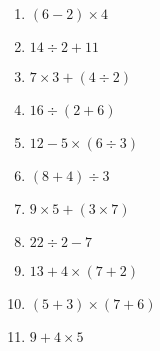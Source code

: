 \documentclass{article}
\begin{document}
\begin{enumerate}
\item \quad \( (6 - 2) \times 4 \)
\vspace{45pt}
\hline
\vspace{5pt}

\item \quad \( 14 \div 2 + 11 \)
\vspace{45pt}
\hline
\vspace{5pt}

\item \quad \( 7 \times 3 + (4 \div 2) \)
\vspace{45pt}
\hline
\vspace{5pt}

\item \quad \( 16 \div (2 + 6) \)
\vspace{45pt}
\hline
\vspace{5pt}

\item \quad \( 12 - 5 \times (6 \div 3) \)
\vspace{45pt}
\hline
\vspace{5pt}

\item \quad \( (8 + 4) \div 3 \)
\vspace{45pt}
\hline
\vspace{5pt}

\item \quad \( 9 \times 5 + (3 \times 7) \)
\vspace{45pt}
\hline
\vspace{5pt}

\item \quad \( 22 \div 2 - 7 \)
\vspace{45pt}
\hline
\vspace{5pt}

\item \quad \( 13 + 4 \times (7 + 2) \)
\vspace{45pt}
\hline
\vspace{5pt}

\item \quad \( (5 + 3) \times (7 + 6) \)
\vspace{45pt} 
\vspace{5pt}

\item \quad \( 9 + 4 \times 5 \)
\vspace{45pt} 
\hline
\vspace{5pt}


\end{enumerate}
\end{document}
